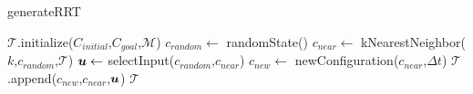 %
  \begin{algorithm}
  \caption{generateRRT}
  \label{algo:RRT} 
  \DontPrintSemicolon
  $\mathcal{T}$.initialize($C_{initial}$,$C_{goal}$,$\mathcal{M}$)\;\label{ln:initialize_tree}
  {
    $c_{random}\gets$ randomState()\;\label{ln:random_generator}
    $c_{near} \gets$ kNearestNeighbor($k$,$c_{random}$,$\mathcal{T}$)\;\label{ln:knn}
    $\vb*{u} \gets$ selectInput($c_{random}$,$c_{near}$)\;\label{ln:direction}
    $c_{new} \gets$ newConfiguration($c_{near}$,$\Delta t$)\;\label{ln:assign_new}
    $\mathcal{T}$.append($c_{new}$,$c_{near}$,$\vb*{u}$)\;
  }
    \KwRet $\mathcal{T}$\;

  \end{algorithm}
%
